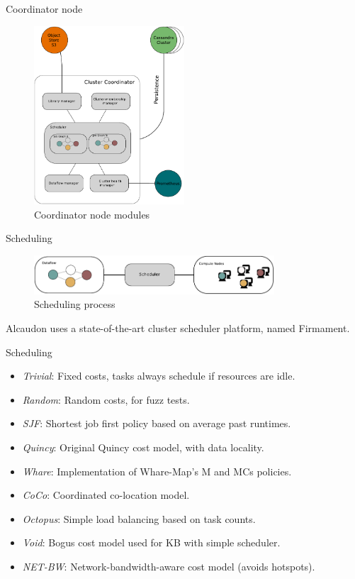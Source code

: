 \documentclass[10pt]{beamer}
\begin{document}
\begin{frame}[fragile]{Coordinator node}
  \begin{figure}[!h]
    \centering
    \includegraphics[width=0.5\textwidth]{../figures/coordinator.pdf}
    \caption{Coordinator node modules}
    \label{fig:coordinatormodules}
  \end{figure}
\end{frame}


\begin{frame}[fragile]{Scheduling}
  \begin{figure}[!h]
    \centering
    \includegraphics[width=0.8\textwidth]{../figures/scheduling.pdf}
    \caption{Scheduling process}
    \label{fig:scheduler}
  \end{figure}
  Alcaudon uses a state-of-the-art cluster scheduler platform,
  named \alert{Firmament}.
\end{frame}

\begin{frame}[fragile]{Scheduling}

  \begin{itemize}
  \item \textit{Trivial}: Fixed costs, tasks always schedule if resources are idle.
  \item \textit{Random}: Random costs, for fuzz tests.
  \item \textit{SJF}: Shortest job first policy based on average past runtimes.
  \item \textit{Quincy}: Original Quincy cost model, with data locality.
  \item \textit{Whare}: Implementation of Whare-Map's M and MCs policies.
  \item \textit{\alert{CoCo}}: Coordinated co-location model.
  \item \textit{Octopus}: Simple load balancing based on task counts.
  \item \textit{Void}: Bogus cost model used for KB with simple scheduler.
  \item \textit{NET-BW}: Network-bandwidth-aware cost model (avoids hotspots).
  \end{itemize}
\end{frame}
\end{document}

